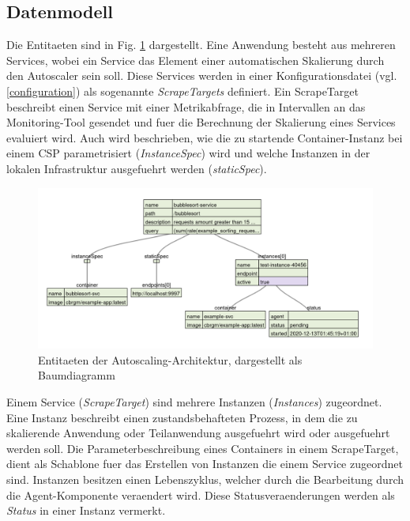 \documentclass[runningheads]{llncs}
\begin{document}
\subsection{Datenmodell}

Die Entitaeten sind in Fig. \ref{datenmodell} dargestellt. Eine Anwendung besteht aus mehreren Services, wobei ein Service das Element einer automatischen Skalierung durch den Autoscaler sein soll. Diese Services werden in einer Konfigurationsdatei (vgl. \ref{configuration}) als sogenannte \textit{ScrapeTargets} definiert. Ein ScrapeTarget beschreibt einen Service mit einer Metrikabfrage, die in Intervallen an das Monitoring-Tool gesendet und fuer die Berechnung der Skalierung eines Services evaluiert wird. Auch wird beschrieben, wie die zu startende Container-Instanz bei einem CSP parametrisiert (\textit{InstanceSpec}) wird und welche Instanzen in der lokalen Infrastruktur ausgefuehrt werden (\textit{staticSpec}).

\begin{figure}[h]
	\centering
	\includegraphics[width=1.0\linewidth,scale=1.0]{images/datamodel.png}
	\caption{Entitaeten der Autoscaling-Architektur, dargestellt als Baumdiagramm}
	\label{datenmodell}
\end{figure}

Einem Service (\textit{ScrapeTarget}) sind mehrere Instanzen (\textit{Instances}) zugeordnet. Eine Instanz beschreibt einen zustandsbehafteten Prozess, in dem die zu skalierende Anwendung oder Teilanwendung ausgefuehrt wird oder ausgefuehrt werden soll. Die Parameterbeschreibung eines Containers  in einem ScrapeTarget,  dient als Schablone fuer das Erstellen von Instanzen die einem Service zugeordnet sind. Instanzen besitzen einen Lebenszyklus, welcher durch die Bearbeitung durch die Agent-Komponente veraendert wird. Diese Statusveraenderungen werden als \textit{Status} in einer Instanz vermerkt.
	
\end{document}

